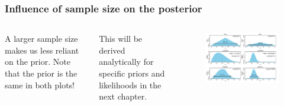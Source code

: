 \documentclass[usenames,dvipsnames,table]{beamer}
\begin{document}
\begin{frame}
\frametitle{Influence of sample size on the posterior}
\begin{columns}[c]
A larger sample size makes us less reliant on the prior. Note that the prior is the same in both plots!

\vspace{1em}
This will be derived analytically for specific priors and likelihoods in the next chapter.

\begin{figure}
\centering
\includegraphics[width=\linewidth]{img/fig5_2}
\end{figure}
\end{columns}
\end{frame}
\end{document}
